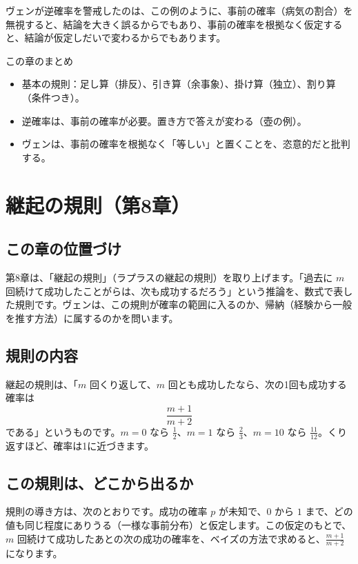 \documentclass[a4paper,11pt,openany]{ltjsbook}
\begin{document}
ヴェンが逆確率を警戒したのは、この例のように、事前の確率（病気の割合）を無視すると、結論を大きく誤るからでもあり、事前の確率を根拠なく仮定すると、結論が仮定しだいで変わるからでもあります。

\begin{pointbox}{この章のまとめ}
\begin{itemize}[leftmargin=*]
\item 基本の規則：足し算（排反）、引き算（余事象）、掛け算（独立）、割り算（条件つき）。
\item 逆確率は、事前の確率が必要。置き方で答えが変わる（壺の例）。
\item ヴェンは、事前の確率を根拠なく「等しい」と置くことを、恣意的だと批判する。
\end{itemize}
\end{pointbox}

\chapter{継起の規則（第8章）}

\section{この章の位置づけ}

第8章は、「継起の規則」（ラプラスの継起の規則）を取り上げます。「過去に $m$ 回続けて成功したことがらは、次も成功するだろう」という推論を、数式で表した規則です。ヴェンは、この規則が確率の範囲に入るのか、帰納（経験から一般を推す方法）に属するのかを問います。

\section{規則の内容}

継起の規則は、「$m$ 回くり返して、$m$ 回とも成功したなら、次の1回も成功する確率は
\[
\frac{m+1}{m+2}
\]
である」というものです。$m=0$ なら $\tfrac12$、$m=1$ なら $\tfrac23$、$m=10$ なら $\tfrac{11}{12}$。くり返すほど、確率は1に近づきます。

\section{この規則は、どこから出るか}

規則の導き方は、次のとおりです。成功の確率 $p$ が未知で、$0$ から $1$ まで、どの値も同じ程度にありうる（一様な事前分布）と仮定します。この仮定のもとで、$m$ 回続けて成功したあとの次の成功の確率を、ベイズの方法で求めると、$\frac{m+1}{m+2}$ になります。
\end{document}
